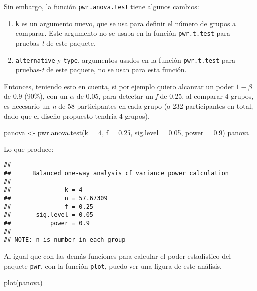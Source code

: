 \documentclass[
]{article}
\newenvironment{Shaded}{\begin{snugshade}}{\end{snugshade}}
\newcommand{\AttributeTok}[1]{\textcolor[rgb]{0.16,0.50,0.73}{#1}}
\newcommand{\DecValTok}[1]{\textcolor[rgb]{0.96,0.45,0.00}{#1}}
\newcommand{\FloatTok}[1]{\textcolor[rgb]{0.96,0.45,0.00}{#1}}
\newcommand{\FunctionTok}[1]{\textcolor[rgb]{0.56,0.27,0.68}{#1}}
\newcommand{\NormalTok}[1]{\textcolor[rgb]{0.81,0.81,0.76}{#1}}
\newcommand{\OtherTok}[1]{\textcolor[rgb]{0.15,0.68,0.38}{#1}}
\providecommand{\tightlist}{%
  \setlength{\itemsep}{0pt}\setlength{\parskip}{0pt}}
\begin{document}
Sin embargo, la función \texttt{pwr.anova.test} tiene algunos cambios:

\begin{enumerate}
\def\labelenumi{\arabic{enumi}.}
\tightlist
\item
  \texttt{k} es un argumento nuevo, que se usa para definir el número de
  grupos a comparar. Este argumento no se usaba en la función
  \texttt{pwr.t.test} para pruebas-\emph{t} de este paquete.
\item
  \texttt{alternative} y \texttt{type}, argumentos usados en la función
  \texttt{pwr.t.test} para pruebas-\emph{t} de este paquete, no se usan
  para esta función.
\end{enumerate}

Entonces, teniendo esto en cuenta, si por ejemplo quiero alcanzar un
poder \(1 - \beta\) de 0.9 (90\%), con un \(\alpha\) de 0.05, para
detectar un \emph{f} de 0.25, al comparar 4 grupos, es necesario un
\emph{n} de 58 participantes en cada grupo (o 232 participantes en
total, dado que el diseño propuesto tendría 4 grupos).

\begin{Shaded}
\begin{Highlighting}[]
\NormalTok{panova }\OtherTok{\textless{}{-}} \FunctionTok{pwr.anova.test}\NormalTok{(}\AttributeTok{k =} \DecValTok{4}\NormalTok{,}
                         \AttributeTok{f =} \FloatTok{0.25}\NormalTok{,}
                         \AttributeTok{sig.level =} \FloatTok{0.05}\NormalTok{,}
                         \AttributeTok{power =} \FloatTok{0.9}\NormalTok{)}
\NormalTok{panova}
\end{Highlighting}
\end{Shaded}

Lo que produce:

\begin{verbatim}
## 
##      Balanced one-way analysis of variance power calculation 
## 
##               k = 4
##               n = 57.67309
##               f = 0.25
##       sig.level = 0.05
##           power = 0.9
## 
## NOTE: n is number in each group
\end{verbatim}

Al igual que con las demás funciones para calcular el poder estadístico
del paquete \texttt{pwr}, con la función \texttt{plot}, puedo ver una
figura de este análisis.

\begin{Shaded}
\begin{Highlighting}[]
\FunctionTok{plot}\NormalTok{(panova)}
\end{Highlighting}
\end{Shaded}
\end{document}
